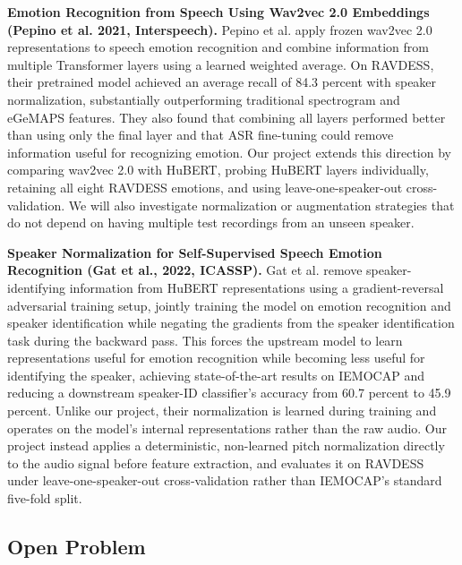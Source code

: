 \documentclass[11pt, letterpaper]{article}
\begin{document}
\textbf{Emotion Recognition from Speech Using Wav2vec 2.0 Embeddings (Pepino et al. 2021, Interspeech).} Pepino et al. apply frozen wav2vec 2.0 representations to speech emotion recognition and combine information from multiple Transformer layers using a learned weighted average. On RAVDESS, their pretrained model achieved an average recall of 84.3 percent with speaker normalization, substantially outperforming traditional spectrogram and eGeMAPS features. They also found that combining all layers performed better than using only the final layer and that ASR fine-tuning could remove information useful for recognizing emotion. Our project extends this direction by comparing wav2vec 2.0 with HuBERT, probing HuBERT layers individually, retaining all eight RAVDESS emotions, and using leave-one-speaker-out cross-validation. We will also investigate normalization or augmentation strategies that do not depend on having multiple test recordings from an unseen speaker.

\textbf{Speaker Normalization for Self-Supervised Speech Emotion Recognition (Gat et al., 2022, ICASSP).} Gat et al. remove speaker-identifying information from HuBERT representations using a gradient-reversal adversarial training setup, jointly training the model on emotion recognition and speaker identification while negating the gradients from the speaker identification task during the backward pass. This forces the upstream model to learn representations useful for emotion recognition while becoming less useful for identifying the speaker, achieving state-of-the-art results on IEMOCAP and reducing a downstream speaker-ID classifier's accuracy from 60.7 percent to 45.9 percent. Unlike our project, their normalization is learned during training and operates on the model's internal representations rather than the raw audio. Our project instead applies a deterministic, non-learned pitch normalization directly to the audio signal before feature extraction, and evaluates it on RAVDESS under leave-one-speaker-out cross-validation rather than IEMOCAP's standard five-fold split.

\subsection{Open Problem}
\end{document}

